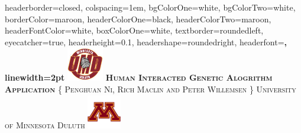 \documentclass[landscape,a0paper,fontscale=0.285]{baposter} %
\begin{document}
	\begin{poster}
	{
	headerborder=closed, %
	colspacing=1em, %
	bgColorOne=white, %
	bgColorTwo=white, %
	borderColor=maroon,
	headerColorOne=black, %
	headerColorTwo=maroon,
	headerFontColor=white, %
	boxColorOne=white, %
	textborder=roundedleft, %
	eyecatcher=true, %
	headerheight=0.1\textheight, %
	headershape=roundedright, %
	headerfont=\Large\bf\textsc, %
	linewidth=2pt %
	}
	{\includegraphics[height=4em]{UMD.png}}
	{\bf\textsc{Human Interacted Genetic Alogrithm Application}\vspace{0.5em}} %
	{\textsc{\{ Penghuan Ni, Rich Maclin and Peter Willemsen \} \hspace{12pt} University of Minnesota Duluth}} %
	{\includegraphics[height=4em]{UMN.jpg}}


\end{poster}
\end{document}
